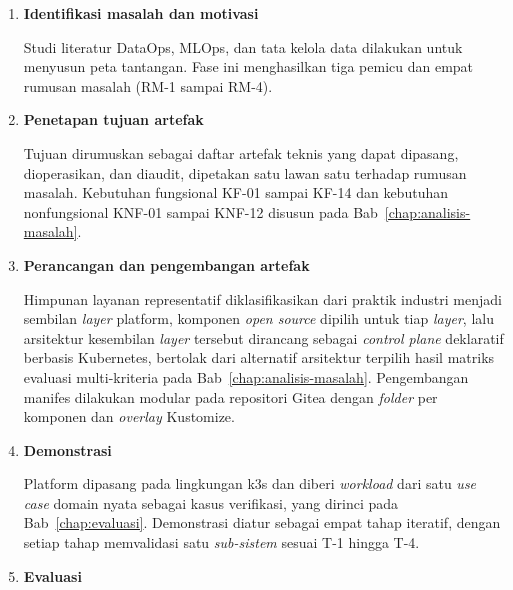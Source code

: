 \vspace{0.5em}
\begin{enumerate}
    \item \textbf{Identifikasi masalah dan motivasi}

    Studi literatur DataOps, MLOps, dan tata kelola data dilakukan untuk menyusun peta tantangan. Fase ini menghasilkan tiga pemicu dan empat rumusan masalah (RM-1 sampai RM-4).

    \vspace{0.5em}

    \item \textbf{Penetapan tujuan artefak}

    Tujuan dirumuskan sebagai daftar artefak teknis yang dapat dipasang, dioperasikan, dan diaudit, dipetakan satu lawan satu terhadap rumusan masalah. Kebutuhan fungsional KF-01 sampai KF-14 dan kebutuhan nonfungsional KNF-01 sampai KNF-12 disusun pada Bab~\ref{chap:analisis-masalah}.

    \vspace{0.5em}

    \item \textbf{Perancangan dan pengembangan artefak}

    Himpunan layanan representatif diklasifikasikan dari praktik industri menjadi sembilan \textit{layer} platform, komponen \textit{open source} dipilih untuk tiap \textit{layer}, lalu arsitektur kesembilan \textit{layer} tersebut dirancang sebagai \textit{control plane} deklaratif berbasis Kubernetes, bertolak dari alternatif arsitektur terpilih hasil matriks evaluasi multi-kriteria pada Bab~\ref{chap:analisis-masalah}. Pengembangan manifes dilakukan modular pada repositori Gitea dengan \textit{folder} per komponen dan \textit{overlay} Kustomize.

    \vspace{0.5em}

    \item \textbf{Demonstrasi}

    Platform dipasang pada lingkungan k3s dan diberi \textit{workload} dari satu \textit{use case} domain nyata sebagai kasus verifikasi, yang dirinci pada Bab~\ref{chap:evaluasi}. Demonstrasi diatur sebagai empat tahap iteratif, dengan setiap tahap memvalidasi satu \textit{sub-sistem} sesuai T-1 hingga T-4.

    \vspace{0.5em}

    \item \textbf{Evaluasi}


\end{enumerate}
